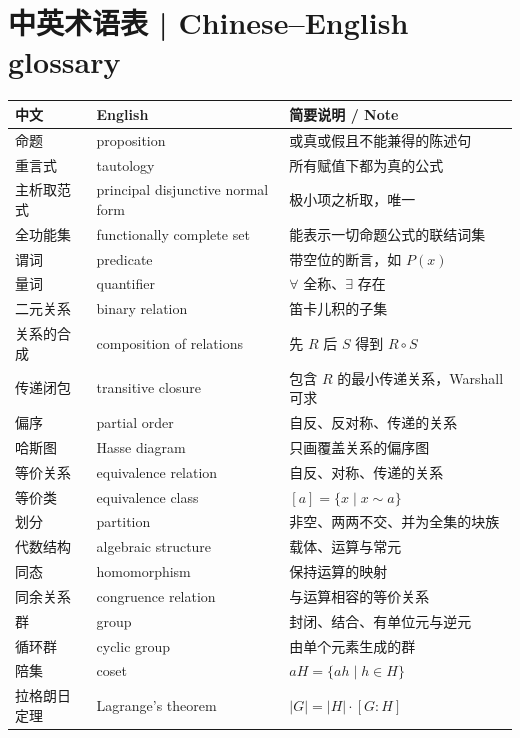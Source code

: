 \documentclass[UTF8,11pt,a4paper]{ctexart}
\begin{document}
\clearpage
\section*{中英术语表 | Chinese--English glossary}
\noindent\footnotesize
\begin{longtable}{@{}>{\raggedright\arraybackslash}p{3.0cm}>{\raggedright\arraybackslash}p{4.9cm}>{\raggedright\arraybackslash}p{7.0cm}@{}}
\toprule
\textbf{中文} & \textbf{English} & \textbf{简要说明 / Note} \\
\midrule
\endhead
命题 & proposition & 或真或假且不能兼得的陈述句 \\
\hline
重言式 & tautology & 所有赋值下都为真的公式 \\
\hline
主析取范式 & principal disjunctive normal form & 极小项之析取，唯一 \\
\hline
全功能集 & functionally complete set & 能表示一切命题公式的联结词集 \\
\hline
谓词 & predicate & 带空位的断言，如 $P(x)$ \\
\hline
量词 & quantifier & $\forall$ 全称、$\exists$ 存在 \\
\hline
二元关系 & binary relation & 笛卡儿积的子集 \\
\hline
关系的合成 & composition of relations & 先 $R$ 后 $S$ 得到 $R\circ S$ \\
\hline
传递闭包 & transitive closure & 包含 $R$ 的最小传递关系，Warshall 可求 \\
\hline
偏序 & partial order & 自反、反对称、传递的关系 \\
\hline
哈斯图 & Hasse diagram & 只画覆盖关系的偏序图 \\
\hline
等价关系 & equivalence relation & 自反、对称、传递的关系 \\
\hline
等价类 & equivalence class & $[a]=\{x\mid x\sim a\}$ \\
\hline
划分 & partition & 非空、两两不交、并为全集的块族 \\
\hline
代数结构 & algebraic structure & 载体、运算与常元 \\
\hline
同态 & homomorphism & 保持运算的映射 \\
\hline
同余关系 & congruence relation & 与运算相容的等价关系 \\
\hline
群 & group & 封闭、结合、有单位元与逆元 \\
\hline
循环群 & cyclic group & 由单个元素生成的群 \\
\hline
陪集 & coset & $aH=\{ah\mid h\in H\}$ \\
\hline
拉格朗日定理 & Lagrange's theorem & $|G|=|H|\cdot[G:H]$ \\

\end{longtable}
\end{document}

